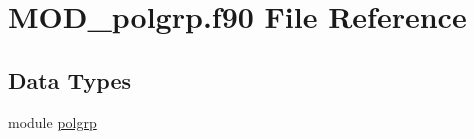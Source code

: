 \hypertarget{MOD__polgrp_8f90}{\section{M\-O\-D\-\_\-polgrp.\-f90 File Reference}
\label{MOD__polgrp_8f90}
}
\subsection*{Data Types}
\begin{DoxyCompactItemize}
\item 
module \hyperlink{classpolgrp}{polgrp}
\end{DoxyCompactItemize}
